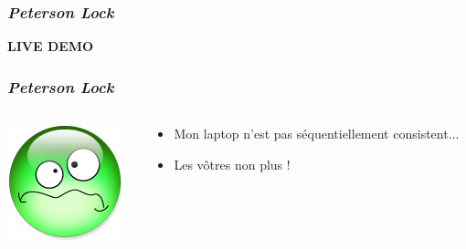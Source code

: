 \documentclass[xcolor={x11names,svgnames}]{beamer}
\begin{document}

\begin{frame}[label=peterson_demo]
  \frametitle{\emph{Peterson Lock}}

  \centering \Huge \bfseries LIVE DEMO
\end{frame}



\begin{frame}[label=peterson_demo_report]
  \frametitle{\emph{Peterson Lock}}

    \begin{columns}[c]
    \begin{column}{.1\textwidth}
      \includegraphics[width=\textwidth]{triste.png}
    \end{column}
    \begin{column}{.9\textwidth}
      \begin{itemize}
      \item Mon laptop n'est pas séquentiellement consistent...
        \pause
      \item Les vôtres non plus !
      \end{itemize}
    \end{column}
  \end{columns}
\end{frame}
\end{document}
